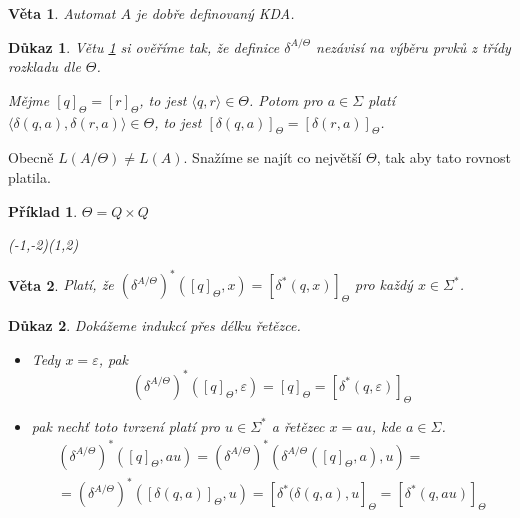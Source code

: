 \documentclass[10pt, a4paper, titlepage]{article}
\theoremstyle{note}
\newtheorem{dukaz}{Důkaz}
\newtheorem{veta}{Věta}
\newtheorem{priklad}{Příklad}
\begin{document}
\begin{veta}\label{veta-aut}
Automat $A$ je dobře definovaný KDA.
\end{veta}

\begin{dukaz}
Větu \ref{veta-aut} si ověříme tak, že definice $\delta^{A/\Theta}$ nezávisí na výběru prvků z třídy rozkladu
dle $\Theta$.

Mějme $[q]_\Theta = [r]_\Theta$,  to jest $\langle q,r \rangle \in \Theta$. Potom pro $a \in \Sigma$ platí $\langle \delta(q,a), \delta(r,a) \rangle \in \Theta$, to jest $[ \delta(q,a)]_\Theta = [ \delta(r,a)]_\Theta$.
\end{dukaz}

Obecně $L(A/\Theta) \neq L(A)$. Snažíme se najít co největší $\Theta$, tak aby tato rovnost platila.

\begin{priklad}
$\Theta = Q \times Q$
\begin{center}
\begin{VCPicture}{(-1,-2)(1,2)}
\end{VCPicture}
\end{center}

\end{priklad}

\begin{veta}\label{veta-x2}
Platí, že $(\delta^{A/\Theta})^*([q]_\Theta,x)=[\delta^*(q,x)]_\Theta$ pro každý $x \in \Sigma^*$.
\end{veta}

\begin{dukaz}
Dokážeme indukcí přes délku řetězce.
\begin{itemize}
\item
Tedy $x = \varepsilon$, pak
$$(\delta^{A/ \Theta})^{*}([q]_\Theta,\varepsilon)=[q]_\Theta=[\delta^{*}(q,\varepsilon)]_\Theta$$

\item
pak nechť toto tvrzení platí pro $u \in \Sigma^{*}$ a řetězec $x = au$, kde $a \in \Sigma$.
\begin{gather*}
(\delta^{A/ \Theta})^{*}([q]_{\Theta}, au) = (\delta^{A/ \Theta})^{*}(\delta^{A/ \Theta} ([q]_{\Theta}, a), u ) = \\
= (\delta^{A/ \Theta})^{*} ([\delta(q, a)]_{\Theta}, u) = [\delta^{*} (\delta(q, a), u]_{\Theta} = [\delta^{*} (q, au)]_{\Theta}
\end{gather*}
\end{itemize}
\end{dukaz}
\end{document}
